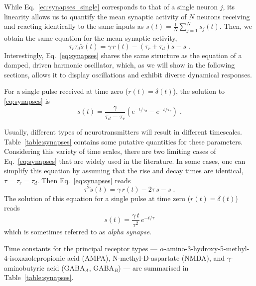 \documentclass[12pt]{article}
\numberwithin{equation}{section}
\begin{document}
While Eq.~\eqref{eq:synapses_single} corresponds to that of a single neuron $j$, its linearity allows us to  quantify the mean synaptic activity of $N$ neurons receiving and reacting identically to the same inputs as
$
s(t)=\frac{1}{N}\sum_{j=1}^N s_j(t)
$.
Then, we obtain the same equation for the mean synaptic activity,
\begin{equation}\label{eq:synapses}
    \tau_r\tau_d\ddot s(t)= \gamma \, r(t) - (\tau_r+\tau_d) \dot s -s\;.
\end{equation}
Interestingly, Eq.~\eqref{eq:synapses} shares the same structure as the equation of a damped, driven harmonic oscillator, which, as we will show in the following sections, allows it to display oscillations and exhibit diverse dynamical responses.

For a single pulse received at time zero ($r(t)=\delta(t)$), the solution to \eqref{eq:synapses} is
\begin{equation}
s(t)=\frac{\gamma}{\tau_d-\tau_r}\left( e^{-t/\tau_d} - e^{-t/\tau_r}\right)\;.
\end{equation}

Usually, different types of neurotransmitters will result in different timescales.
Table~\ref{table:synapses} contains some putative quantities for these parameters.
Considering this variety of time scales, 
there are two limiting cases of Eq.~\eqref{eq:synapses} that are widely used in the literature.
In some cases, one can simplify this equation by assuming that the rise
and decay times are identical, $\tau=\tau_r=\tau_d$. 
Then Eq.~\ref{eq:synapses} reads
\begin{equation}\label{eq:synapses_2nd}
    \tau^2\ddot s(t)= \gamma \,  r(t) - 2\tau \, \dot s -s\;.
\end{equation}
The solution of this equation for a single pulse at time zero ($r(t)=\delta(t)$)
reads
\begin{equation}
s(t)=\frac{\gamma \, t}{\tau^2}\, e^{-t/\tau}
\end{equation}
which is sometimes referred to as \emph{alpha synapse}.   


Time constants for the principal receptor types — $\alpha$-amino-3-hydroxy-5-methyl-4-isoxazolepropionic acid (AMPA), N-methyl-D-aspartate (NMDA), and $\gamma$-aminobutyric acid (GABA$_A$, GABA$_B$) — are summarised in Table~\ref{table:synapses}.

\end{document}
